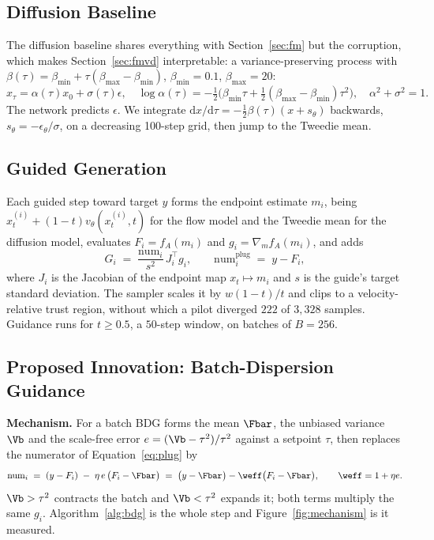 \subsection{Diffusion Baseline}
\label{sec:diff}

The diffusion baseline shares everything with Section~\ref{sec:fm} but the corruption,
which makes Section~\ref{sec:fmvd} interpretable: a variance-preserving process with
$\beta(\tau)=\beta_{\min}+\tau(\beta_{\max}-\beta_{\min})$, $\beta_{\min}=0.1$,
$\beta_{\max}=20$:
\begin{equation}
x_\tau=\alpha(\tau)x_0+\sigma(\tau)\epsilon,
\quad
\log\alpha(\tau)=-\tfrac12\big(\beta_{\min}\tau+\tfrac12(\beta_{\max}-\beta_{\min})\tau^2\big),
\quad \alpha^2+\sigma^2=1 .
\label{eq:vp}
\end{equation}
The network predicts $\epsilon$. We integrate
$\mathrm{d}x/\mathrm{d}\tau=-\tfrac12\beta(\tau)(x+s_\theta)$ backwards,
$s_\theta=-\epsilon_\theta/\sigma$, on a decreasing 100-step grid, then jump to the
Tweedie mean.

\subsection{Guided Generation}
\label{sec:guidance}

Each guided step toward target $y$ forms the endpoint estimate $m_i$, being
$x_t^{(i)}+(1-t)v_\theta(x_t^{(i)},t)$ for the flow model and the Tweedie mean for the
diffusion model, evaluates $F_i=f_A(m_i)$ and $g_i=\nabla_m f_A(m_i)$, and adds
\begin{equation}
G_i \;=\; \frac{\mathrm{num}_i}{s^2}\,J_i^{\!\top} g_i ,
\qquad
\mathrm{num}_i^{\mathrm{plug}} \;=\; y - F_i ,
\label{eq:plug}
\end{equation}
where $J_i$ is the Jacobian of the endpoint map $x_t\!\mapsto\!m_i$ and $s$ is the
guide's target standard deviation. The
sampler scales it by $w(1-t)/t$ and clips to a velocity-relative trust region, without
which a pilot diverged $222$ of $3{,}328$ samples. Guidance runs for
$t\ge0.5$, a $50$-step window, on batches of $B=256$.

\subsection{Proposed Innovation: Batch-Dispersion Guidance}
\label{sec:bdg}

\textbf{Mechanism.} For a batch BDG forms the mean $\Fbar$, the unbiased variance $\Vb$
and the scale-free error $e=(\Vb-\tau^2)/\tau^2$ against a setpoint $\tau$, then
replaces the numerator of Equation~\eqref{eq:plug} by
\begin{equation}
\mathrm{num}_i \;=\; (y-F_i)\;-\;\eta\,e\,\big(F_i-\Fbar\big)
\;=\;\big(y-\Fbar\big)-\weff\big(F_i-\Fbar\big),
\qquad \weff=1+\eta e .
\label{eq:bdgnum}
\end{equation}
$\Vb>\tau^2$ contracts the batch and $\Vb<\tau^2$ expands it; both terms multiply the
same $g_i$. Algorithm~\ref{alg:bdg} is the whole step
and Figure~\ref{fig:mechanism} is it measured.

